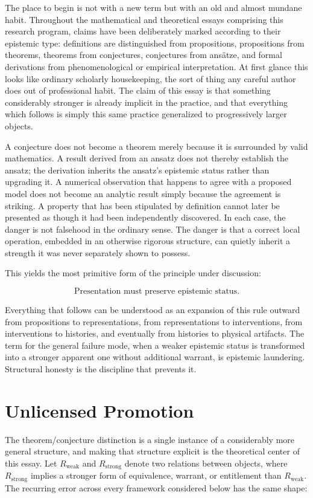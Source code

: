 \documentclass[11pt]{article}
\begin{document}
The place to begin is not with a new term but with an old and almost mundane habit. Throughout the mathematical and theoretical essays comprising this research program, claims have been deliberately marked according to their epistemic type: definitions are distinguished from propositions, propositions from theorems, theorems from conjectures, conjectures from ansätze, and formal derivations from phenomenological or empirical interpretation. At first glance this looks like ordinary scholarly housekeeping, the sort of thing any careful author does out of professional habit. The claim of this essay is that something considerably stronger is already implicit in the practice, and that everything which follows is simply this same practice generalized to progressively larger objects.

A conjecture does not become a theorem merely because it is surrounded by valid mathematics. A result derived from an ansatz does not thereby establish the ansatz; the derivation inherits the ansatz's epistemic status rather than upgrading it. A numerical observation that happens to agree with a proposed model does not become an analytic result simply because the agreement is striking. A property that has been stipulated by definition cannot later be presented as though it had been independently discovered. In each case, the danger is not falsehood in the ordinary sense. The danger is that a correct local operation, embedded in an otherwise rigorous structure, can quietly inherit a strength it was never separately shown to possess.

This yields the most primitive form of the principle under discussion:

\[
\boxed{\text{Presentation must preserve epistemic status.}}
\]

Everything that follows can be understood as an expansion of this rule outward from propositions to representations, from representations to interventions, from interventions to histories, and eventually from histories to physical artifacts. The term for the general failure mode, when a weaker epistemic status is transformed into a stronger apparent one without additional warrant, is epistemic laundering. Structural honesty is the discipline that prevents it.

\section{Unlicensed Promotion}
\label{sec:promotion}

The theorem/conjecture distinction is a single instance of a considerably more general structure, and making that structure explicit is the theoretical center of this essay. Let $R_{\mathrm{weak}}$ and $R_{\mathrm{strong}}$ denote two relations between objects, where $R_{\mathrm{strong}}$ implies a stronger form of equivalence, warrant, or entitlement than $R_{\mathrm{weak}}$. The recurring error across every framework considered below has the same shape:
\end{document}
